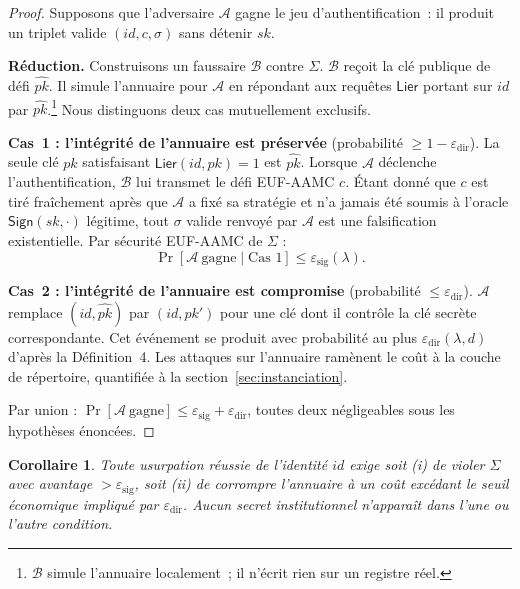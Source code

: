 \documentclass[11pt,a4paper]{article}
\newtheorem{corollaire}[theoreme]{Corollaire}
\begin{document}
\begin{proof}
Supposons que l'adversaire $\mathcal{A}$ gagne le jeu d'authentification~:
il produit un triplet valide $(id, c, \sigma)$ sans détenir $sk$.

\textbf{Réduction.}  Construisons un faussaire $\mathcal{B}$ contre $\Sigma$.
$\mathcal{B}$ reçoit la clé publique de défi $\hat{pk}$.  Il simule l'annuaire
pour $\mathcal{A}$ en répondant aux requêtes $\mathsf{Lier}$ portant sur $id$
par $\hat{pk}$.\footnote{$\mathcal{B}$ simule l'annuaire localement~; il
n'écrit rien sur un registre réel.}  Nous distinguons deux cas mutuellement
exclusifs.

\textbf{Cas~1 : l'intégrité de l'annuaire est préservée} (probabilité
$\geq 1 - \varepsilon_{\mathrm{dir}}$).  La seule clé $pk$ satisfaisant
$\mathsf{Lier}(id,pk)=1$ est $\hat{pk}$.  Lorsque $\mathcal{A}$ déclenche
l'authentification, $\mathcal{B}$ lui transmet le défi EUF-AAMC $c$.  Étant
donné que $c$ est tiré fraîchement après que $\mathcal{A}$ a fixé sa stratégie
et n'a jamais été soumis à l'oracle $\mathsf{Sign}(sk,\cdot)$ légitime,
tout $\sigma$ valide renvoyé par $\mathcal{A}$ est une falsification
existentielle.  Par sécurité EUF-AAMC de $\Sigma$ :
\[
  \Pr[\mathcal{A}\ \text{gagne} \mid \text{Cas~1}]
  \leq \varepsilon_{\mathrm{sig}}(\lambda).
\]

\textbf{Cas~2 : l'intégrité de l'annuaire est compromise} (probabilité
$\leq \varepsilon_{\mathrm{dir}}$).  $\mathcal{A}$ remplace $(id, \hat{pk})$
par $(id, pk')$ pour une clé dont il contrôle la clé secrète correspondante.
Cet événement se produit avec probabilité au plus $\varepsilon_{\mathrm{dir}}(\lambda,d)$
d'après la Définition~4.  Les attaques sur l'annuaire ramènent le coût à la
couche de répertoire, quantifiée à la section~\ref{sec:instanciation}.

Par union :
$\Pr[\mathcal{A}\ \text{gagne}] \leq
\varepsilon_{\mathrm{sig}} + \varepsilon_{\mathrm{dir}}$,
toutes deux négligeables sous les hypothèses énoncées.
\end{proof}

\begin{corollaire}
  Toute usurpation réussie de l'identité $id$ exige soit (i) de violer $\Sigma$
  avec avantage $> \varepsilon_{\mathrm{sig}}$, soit (ii) de corrompre
  l'annuaire à un coût excédant le seuil économique impliqué par
  $\varepsilon_{\mathrm{dir}}$.  Aucun secret institutionnel n'apparaît dans
  l'une ou l'autre condition.
\end{corollaire}
\end{document}
